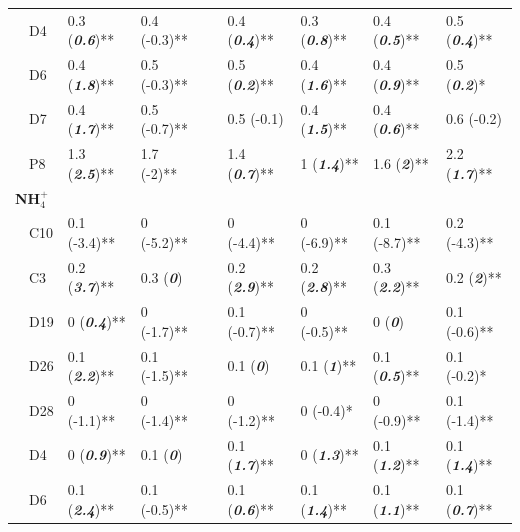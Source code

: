 \documentclass[letterpaper,12pt,oneside]{article}\usepackage[]{graphicx}\usepackage[]{color}
\begin{document}
\begin{table}[!tbp]
\begin{center}
\begin{tabular}{lllcllll}
~~D4&0.3 \footnotesize{(\textit{\textbf{0.6}})**}&0.4 \footnotesize{(-0.3)**}&&0.4 \footnotesize{(\textit{\textbf{0.4}})**}&0.3 \footnotesize{(\textit{\textbf{0.8}})**}&0.4 \footnotesize{(\textit{\textbf{0.5}})**}&0.5 \footnotesize{(\textit{\textbf{0.4}})**}\tabularnewline
~~D6&0.4 \footnotesize{(\textit{\textbf{1.8}})**}&0.5 \footnotesize{(-0.3)**}&&0.5 \footnotesize{(\textit{\textbf{0.2}})**}&0.4 \footnotesize{(\textit{\textbf{1.6}})**}&0.4 \footnotesize{(\textit{\textbf{0.9}})**}&0.5 \footnotesize{(\textit{\textbf{0.2}})*}\tabularnewline
~~D7&0.4 \footnotesize{(\textit{\textbf{1.7}})**}&0.5 \footnotesize{(-0.7)**}&&0.5 \footnotesize{(-0.1)}&0.4 \footnotesize{(\textit{\textbf{1.5}})**}&0.4 \footnotesize{(\textit{\textbf{0.6}})**}&0.6 \footnotesize{(-0.2)}\tabularnewline
~~P8&1.3 \footnotesize{(\textit{\textbf{2.5}})**}&1.7 \footnotesize{(-2)**}&&1.4 \footnotesize{(\textit{\textbf{0.7}})**}&1 \footnotesize{(\textit{\textbf{1.4}})**}&1.6 \footnotesize{(\textit{\textbf{2}})**}&2.2 \footnotesize{(\textit{\textbf{1.7}})**}\tabularnewline
\hline
{\bfseries NH$_{4}^{+}$}&&&&&&&\tabularnewline
~~C10&0.1 \footnotesize{(-3.4)**}&0 \footnotesize{(-5.2)**}&&0 \footnotesize{(-4.4)**}&0 \footnotesize{(-6.9)**}&0.1 \footnotesize{(-8.7)**}&0.2 \footnotesize{(-4.3)**}\tabularnewline
~~C3&0.2 \footnotesize{(\textit{\textbf{3.7}})**}&0.3 \footnotesize{(\textit{\textbf{0}})}&&0.2 \footnotesize{(\textit{\textbf{2.9}})**}&0.2 \footnotesize{(\textit{\textbf{2.8}})**}&0.3 \footnotesize{(\textit{\textbf{2.2}})**}&0.2 \footnotesize{(\textit{\textbf{2}})**}\tabularnewline
~~D19&0 \footnotesize{(\textit{\textbf{0.4}})**}&0 \footnotesize{(-1.7)**}&&0.1 \footnotesize{(-0.7)**}&0 \footnotesize{(-0.5)**}&0 \footnotesize{(\textit{\textbf{0}})}&0.1 \footnotesize{(-0.6)**}\tabularnewline
~~D26&0.1 \footnotesize{(\textit{\textbf{2.2}})**}&0.1 \footnotesize{(-1.5)**}&&0.1 \footnotesize{(\textit{\textbf{0}})}&0.1 \footnotesize{(\textit{\textbf{1}})**}&0.1 \footnotesize{(\textit{\textbf{0.5}})**}&0.1 \footnotesize{(-0.2)*}\tabularnewline
~~D28&0 \footnotesize{(-1.1)**}&0 \footnotesize{(-1.4)**}&&0 \footnotesize{(-1.2)**}&0 \footnotesize{(-0.4)*}&0 \footnotesize{(-0.9)**}&0.1 \footnotesize{(-1.4)**}\tabularnewline
~~D4&0 \footnotesize{(\textit{\textbf{0.9}})**}&0.1 \footnotesize{(\textit{\textbf{0}})}&&0.1 \footnotesize{(\textit{\textbf{1.7}})**}&0 \footnotesize{(\textit{\textbf{1.3}})**}&0.1 \footnotesize{(\textit{\textbf{1.2}})**}&0.1 \footnotesize{(\textit{\textbf{1.4}})**}\tabularnewline
~~D6&0.1 \footnotesize{(\textit{\textbf{2.4}})**}&0.1 \footnotesize{(-0.5)**}&&0.1 \footnotesize{(\textit{\textbf{0.6}})**}&0.1 \footnotesize{(\textit{\textbf{1.4}})**}&0.1 \footnotesize{(\textit{\textbf{1.1}})**}&0.1 \footnotesize{(\textit{\textbf{0.7}})**}\tabularnewline

\end{tabular}
\end{center}
\end{table}
\end{document}
